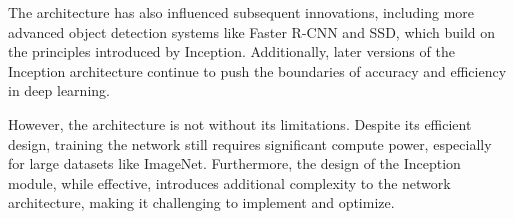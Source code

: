 \documentclass{article}
\begin{document}
The architecture has also influenced subsequent innovations, including more advanced object detection systems like Faster R-CNN and SSD, which build on the principles introduced by Inception. Additionally, later versions of the Inception architecture continue to push the boundaries of accuracy and efficiency in deep learning.

However, the architecture is not without its limitations. Despite its efficient design, training the network still requires significant compute power, especially for large datasets like ImageNet. Furthermore, the design of the Inception module, while effective, introduces additional complexity to the network architecture, making it  challenging to implement and optimize.



\end{document}
